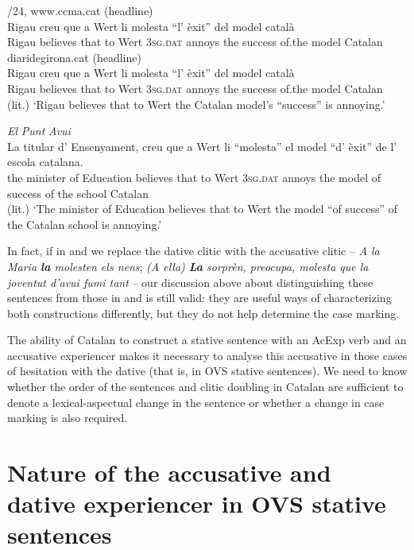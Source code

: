 \documentclass[output=paper,colorlinks,citecolor=brown,modfonts,nonflat]{langsci/langscibook}
\begin{document}
\ea%
 \label{ex:royo:7}
 /24, www.ccma.cat (headline)\\
 \gll Rigau creu que a Wert li molesta “l' èxit” del model català\\
  Rigau believes that to Wert \textsc{3sg.dat} annoys the success of.the model Catalan\\

 \ex diaridegirona.cat (headline)\\
 \gll Rigau creu que a Wert li molesta “l’ èxit” del model català\\
Rigau believes that to Wert \textsc{3sg.dat} annoys   the success of.the model Catalan \\
 \glt (lit.) ‘Rigau believes that to Wert the Catalan model’s “success” is annoying.’

 \ex \emph{El} \emph{Punt} \emph{Avui}\\
 \gll La titular d’ Ensenyament, creu que a Wert li “molesta” el model “d’ èxit” de l’ escola catalana.\\
 the minister of Education believes that to Wert \textsc{3sg.dat} annoys the model of success of the school Catalan\\
 \glt (lit.) ‘The minister of Education believes that to Wert the model “of success” of the Catalan school
is annoying.’
 \z
 \z


In fact, if in  and  we replace the dative clitic with the accusative clitic – \textit{A la Maria \textbf{la} molesten els nens}; \textit{(A ella) \textbf{La }sorprèn, preocupa, molesta que la joventut d’avui fumi tant} – our discussion above about distinguishing these sentences from those in  and  is still valid: they are useful ways of characterizing both constructions differently, but they do not help determine the case marking.

The ability of Catalan to construct a stative sentence with an AcExp verb and an accusative experiencer makes it necessary to analyse this accusative in those cases of hesitation with the dative (that is, in OVS stative sentences). We need to know whether the order of the sentences and clitic doubling in Catalan are sufficient to denote a lexical-aspectual change in the sentence or whether a change in case marking is also required.


\section{Nature of the accusative and dative experiencer in OVS stative sentences}\label{sec:royo:3}
\end{document}
